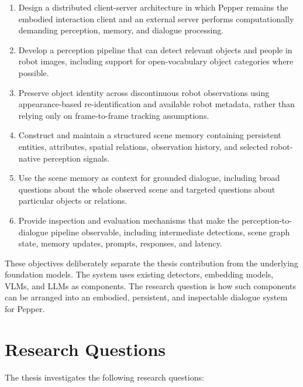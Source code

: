 \begin{enumerate}
    \item Design a distributed client-server architecture in which Pepper remains the embodied interaction client and an external server performs computationally demanding perception, memory, and dialogue processing.

    \item Develop a perception pipeline that can detect relevant objects and people in robot images, including support for open-vocabulary object categories where possible.

    \item Preserve object identity across discontinuous robot observations using appearance-based re-identification and available robot metadata, rather than relying only on frame-to-frame tracking assumptions.

    \item Construct and maintain a structured scene memory containing persistent entities, attributes, spatial relations, observation history, and selected robot-native perception signals.

    \item Use the scene memory as context for grounded dialogue, including broad questions about the whole observed scene and targeted questions about particular objects or relations.

    \item Provide inspection and evaluation mechanisms that make the perception-to-dialogue pipeline observable, including intermediate detections, scene graph state, memory updates, prompts, responses, and latency.
\end{enumerate}

These objectives deliberately separate the thesis contribution from the underlying foundation models. The system uses existing detectors, embedding models, VLMs, and LLMs as components. The research question is how such components can be arranged into an embodied, persistent, and inspectable dialogue system for Pepper.

\section{Research Questions}\label{sec:intro-research-questions}

The thesis investigates the following research questions:

